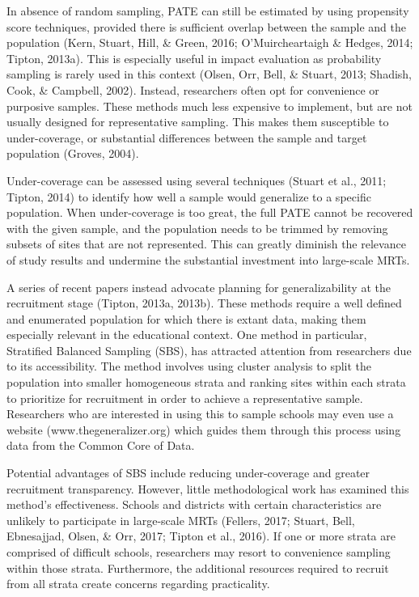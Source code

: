 \documentclass[man,floatsintext]{apa6}
\theoremstyle{definition}
\theoremstyle{definition}
\theoremstyle{definition}
\theoremstyle{remark}
\begin{document}
In absence of random sampling, PATE can still be estimated by using
propensity score techniques, provided there is sufficient overlap
between the sample and the population (Kern, Stuart, Hill, \& Green,
2016; O'Muircheartaigh \& Hedges, 2014; Tipton, 2013a). This is
especially useful in impact evaluation as probability sampling is rarely
used in this context (Olsen, Orr, Bell, \& Stuart, 2013; Shadish, Cook,
\& Campbell, 2002). Instead, researchers often opt for convenience or
purposive samples. These methods much less expensive to implement, but
are not usually designed for representative sampling. This makes them
susceptible to under-coverage, or substantial differences between the
sample and target population (Groves, 2004).

Under-coverage can be assessed using several techniques (Stuart et al.,
2011; Tipton, 2014) to identify how well a sample would generalize to a
specific population. When under-coverage is too great, the full PATE
cannot be recovered with the given sample, and the population needs to
be trimmed by removing subsets of sites that are not represented. This
can greatly diminish the relevance of study results and undermine the
substantial investment into large-scale MRTs.

A series of recent papers instead advocate planning for generalizability
at the recruitment stage (Tipton, 2013a, 2013b). These methods require a
well defined and enumerated population for which there is extant data,
making them especially relevant in the educational context. One method
in particular, Stratified Balanced Sampling (SBS), has attracted
attention from researchers due to its accessibility. The method involves
using cluster analysis to split the population into smaller homogeneous
strata and ranking sites within each strata to prioritize for
recruitment in order to achieve a representative sample. Researchers who
are interested in using this to sample schools may even use a website
(www.thegeneralizer.org) which guides them through this process using
data from the Common Core of Data.

Potential advantages of SBS include reducing under-coverage and greater
recruitment transparency. However, little methodological work has
examined this method's effectiveness. Schools and districts with certain
characteristics are unlikely to participate in large-scale MRTs
(Fellers, 2017; Stuart, Bell, Ebnesajjad, Olsen, \& Orr, 2017; Tipton et
al., 2016). If one or more strata are comprised of difficult schools,
researchers may resort to convenience sampling within those strata.
Furthermore, the additional resources required to recruit from all
strata create concerns regarding practicality.
\end{document}

